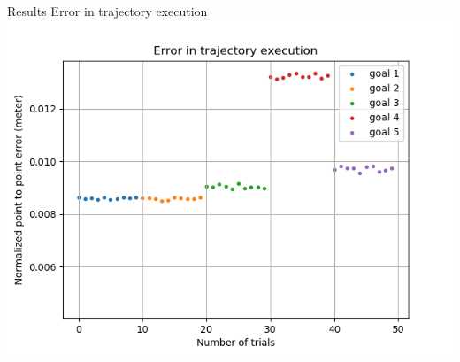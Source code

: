 \documentclass{beamer}
\begin{document}
	\begin{frame}{Results}
		\centering
		Error in trajectory execution
		\includegraphics[scale=0.4]{images/1/inv_par_3_e.png}
	\end{frame}
	
\end{document}
